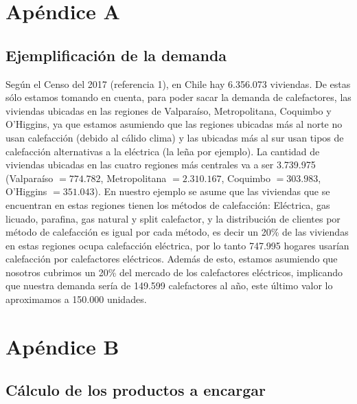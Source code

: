 \documentclass[12pt]{report}
\begin{document}
\section*{Ap\'endice A}

\subsection*{Ejemplificaci\'on de la demanda}
Seg\'un el Censo del 2017 (referencia 1), en Chile hay 6.356.073 viviendas. De estas s\'olo estamos tomando en cuenta, para poder sacar la demanda de calefactores, las viviendas ubicadas en las regiones de Valpara\'iso, Metropolitana, Coquimbo y O'Higgins, ya que estamos asumiendo que las regiones ubicadas m\'as al norte no usan calefacci\'on (debido al c\'alido clima) y las ubicadas m\'as al sur usan tipos de calefacci\'on alternativas a la el\'ectrica (la le\~na por ejemplo). La cantidad de viviendas ubicadas en las cuatro regiones m\'as centrales va a ser 3.739.975 (Valpara\'iso $= 774.782$, Metropolitana $= 2.310.167$, Coquimbo $= 303.983$, O'Higgins $= 351.043$). En nuestro ejemplo se asume que las viviendas que se encuentran en estas regiones tienen los m\'etodos de calefacci\'on: El\'ectrica, gas licuado, parafina, gas natural y split calefactor, y la distribuci\'on de clientes por m\'etodo de calefacci\'on es igual por cada m\'etodo, es decir un 20\% de las viviendas en estas regiones ocupa calefacci\'on el\'ectrica, por lo tanto 747.995 hogares usar\'ian calefacci\'on por calefactores el\'ectricos. Adem\'as de esto, estamos asumiendo que nosotros cubrimos un 20\% del mercado de los calefactores el\'ectricos, implicando que nuestra demanda ser\'ia de 149.599 calefactores al a\~no, este \'ultimo valor lo aproximamos a 150.000 unidades.


\section*{Ap\'endice B}

\subsection*{C\'alculo de los productos a encargar}
\end{document}
